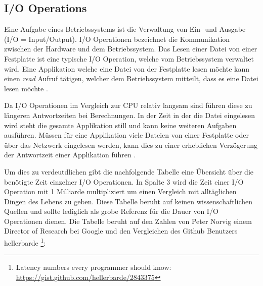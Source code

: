 \subsection{I/O Operations}
\label{subsection: io_operationen}

Eine Aufgabe eines Betriebssystems ist die Verwaltung von Ein- und Ausgabe (I/O = Input/Output). I/O Operationen bezeichnet die Kommunikation zwischen der Hardware und dem Betriebssystem. Das Lesen einer Datei von einer Festplatte ist eine typische I/O Operation, welche vom Betriebssystem verwaltet wird. Eine Applikation welche eine Datei von der Festplatte lesen möchte kann einen \emph{read} Aufruf tätigen, welcher dem Betriebssystem mitteilt, dass es eine Datei lesen möchte \cite[p. 292]{tan09}.

Da I/O Operationen im Vergleich zur CPU relativ langsam sind führen diese zu längeren Antwortzeiten bei Berechnungen.  In der Zeit in der die Datei eingelesen wird  steht die gesamte Applikation still und kann keine weiteren Aufgaben ausführen. Müssen für eine Applikation viele Dateien von einer Festplatte oder über das Netzwerk eingelesen werden, kann dies zu einer erheblichen Verzögerung der Antwortzeit einer Applikation führen \cite[p. 307]{tan09}. 

Um dies zu verdeutdlichen gibt die nachfolgende Tabelle eine Übersicht über die benötigte Zeit einzelner I/O Operationen. In Spalte 3 wird die Zeit einer I/O Operation mit 1 Milliarde multipliziert um einen Vergleich mit alltäglichen Dingen des Lebens zu geben. Diese Tabelle beruht auf keinen wissenschaftlichen Quellen und sollte lediglich als grobe Referenz für die Dauer von I/O Operationen dienen. Die Tabelle beruht auf den Zahlen von Peter Norvig \cite[]{Nor98} einem Director of Research bei Google und den Vergleichen des Github Benutzers hellerbarde \footnote{Latency numbers every programmer should know: \url{https://gist.github.com/hellerbarde/2843375}}:

